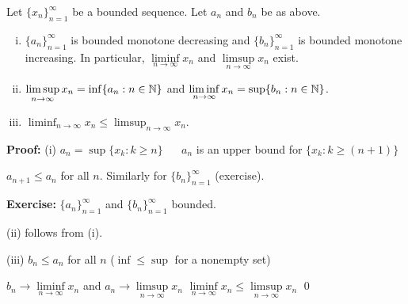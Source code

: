 \documentclass[10pt,aspectratio=169]{beamer}
\begin{document}
\begin{frame}

\begin{proposition}
Let $\{ x_n \}_{n=1}^\infty$ be a bounded sequence.  Let $a_n$ and $b_n$ be
as above.
\pause
\begin{enumerate}[(i)]
\item
$\{ a_n \}_{n=1}^\infty$ is bounded monotone decreasing
and $\{ b_n \}_{n=1}^\infty$ is bounded monotone increasing.  In particular,
$\liminf\limits_{n\to\infty} x_n$ and $\limsup\limits_{n\to\infty} x_n$ exist.
\item\pause
$\displaystyle \limsup_{n \to \infty} x_n = \inf \{ a_n : n \in {\mathbb{N}} \}$
and
$\displaystyle \liminf_{n \to \infty} x_n = \sup \{ b_n : n \in {\mathbb{N}} \}$.
\item\pause
$\displaystyle \liminf_{n \to \infty} x_n \leq
\limsup_{n \to \infty} x_n$.
\end{enumerate}
\end{proposition}

\pause

\textbf{Proof:}
(i) $a_n = \sup \{ x_k : k \geq n \}$ ~\thus~ $a_n$ is an upper bound for
$\{ x_k : k \geq (n+1) \}$

\pause

\thus \quad $a_{n+1} \leq a_n$ for all $n$.
\pause
\quad
Similarly for $\{ b_n \}_{n=1}^\infty$ (exercise).

\pause
\medskip

\textbf{Exercise:}
$\{a_n \}_{n=1}^\infty$ and $\{ b_n \}_{n=1}^\infty$ bounded.

\pause
\medskip

(ii) follows from (i).

\pause
\medskip

(iii)
$b_n \leq a_n$ for all $n$ \quad ($\inf \leq \sup$ for a nonempty set)

\pause
$b_n \to \liminf\limits_{n\to\infty} x_n$ \quad
and \quad $a_n \to \limsup\limits_{n\to\infty} x_n$
\pause
\wthus $\liminf\limits_{n\to\infty} x_n \leq \limsup\limits_{n\to\infty} x_n$ \qed

\end{frame}
\end{document}
